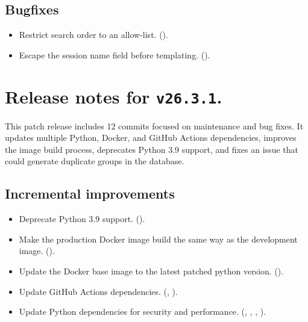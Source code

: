 \subsection*{Bugfixes}
\begin{itemize}
\item{Restrict search order to an allow-list.
    ().}
\item{Escape the session name field before templating.
    ().}
\end{itemize}

\section*{Release notes for \texttt{v26.3.1}.}

  This patch release includes 12 commits focused on maintenance and bug fixes.
It updates multiple Python, Docker, and GitHub Actions dependencies, improves
the image build process, deprecates Python 3.9 support, and fixes an issue that
could generate duplicate groups in the database.

\subsection*{Incremental improvements}
\begin{itemize}
\item{Deprecate Python 3.9 support.
    ().}
\item{Make the production Docker image build the same way as the development image.
    ().}
\item{Update the Docker base image to the latest patched python version.
    ().}
\item{Update GitHub Actions dependencies.
    (,
    ).}
\item{Update Python dependencies for security and performance.
    (,
    ,
    ,
    ).}
\end{itemize}

